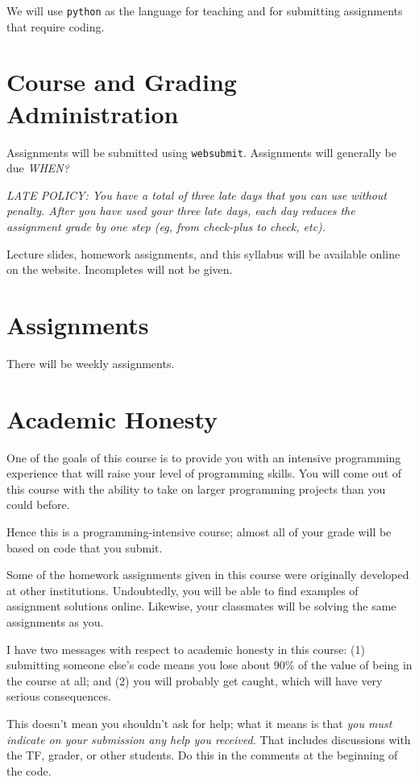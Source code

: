 \documentclass[11pt]{article}
\begin{document}
We will use \texttt{python} as the language for teaching and for
submitting assignments that require coding.



\section*{Course and Grading Administration}


Assignments will be submitted using \texttt{websubmit}.   Assignments will
generally be due \emph{WHEN?}

\emph{LATE POLICY: You have a total of three late days that you can use without penalty.
After you have used your three late days, each day reduces the
assignment grade by one step (eg, from check-plus to check, etc).}

\sloppypar
Lecture slides, homework assignments, and this syllabus will be available
online on the website.  Incompletes will not be given. 

\section*{Assignments}

There will be weekly assignments.

\section*{Academic Honesty}
One of the goals of this course is to provide you with an intensive
programming experience that will raise your level of programming
skills.  You will come out of this course with the ability to take on
larger programming projects than you could before.  

Hence this is a programming-intensive course;  almost all of your grade will
be based on code that you submit.   

Some of the homework assignments given in this course were originally developed
at other institutions.  Undoubtedly, you will be able to find examples of
assignment solutions online.   Likewise, your classmates will be solving
the same assignments as you.

I have two messages with respect to academic honesty in this course: (1)
submitting someone else's code means you lose about 90\% of the value of
being in the course at all;  and (2) you will probably get caught, which
will have very serious consequences.

This doesn't mean you shouldn't ask for help;  what it means is that
\emph{you must indicate on your submission any help you received.}  That
includes discussions with the TF, grader, or other students.  Do this in
the comments at the beginning of the code.
\end{document}
